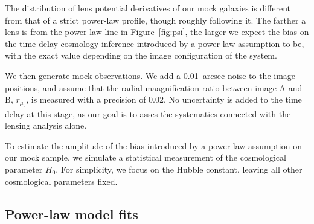 \documentclass[usenatbib]{mnras}
\def\radmagrat{r_{\mu_r}}
\def\Fref#1{Figure~\ref{#1}\xspace}
\begin{document}
%
The distribution of lens potential derivatives of our mock galaxies is different from that of a strict power-law profile, though roughly following it.
The farther a lens is from the power-law line in \Fref{fig:psi}, the larger we expect the bias on the time delay cosmology inference introduced by a power-law assumption to be, with the exact value depending on the image configuration of the system.

We then generate mock observations. We add a 0.01~arcsec noise to the image positions, and assume that the radial maagnification ratio between image A and B, $\radmagrat$, is measured with a precision of 0.02.
No uncertainty is added to the time delay at this stage, as our goal is to asses the systematics connected with the lensing analysis alone.

To estimate the amplitude of the bias introduced by a power-law assumption on our mock sample, we simulate a statistical measurement of the cosmological parameter $H_0$.
For simplicity, we focus on the Hubble constant, leaving all other cosmological parameters fixed.

\subsection{Power-law model fits}
\end{document}
